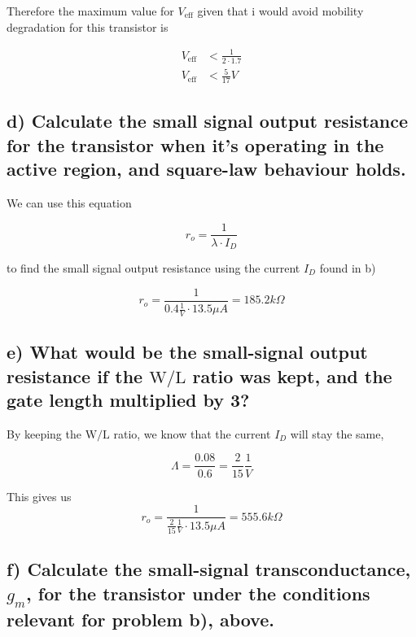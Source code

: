 Therefore the maximum value for $V_{\text{eff}}$ given that i would avoid mobility degradation for this transistor is 

\begin{align*}
    V_{\text{eff}}&<\frac{1}{2\cdot1.7}\\
    V_{\text{eff}}&<\frac{5}{17}V
\end{align*}


\subsection*{d) Calculate the small signal output resistance for the transistor when it's operating in the active region, and square-law behaviour holds.}

We can use this equation

\begin{equation*}
    r_{o}=\frac{1}{\lambda \cdot I_{D}}
\end{equation*}

to find the small signal output resistance using the current $I_D$ found in b)

\begin{equation*}
    r_{o}=\frac{1}{0.4 \frac{1}{V} \cdot 13.5\mu A}=185.2k \Omega
\end{equation*}

\subsection*{e) What would be the small-signal output resistance if the \( \mathrm{W} / \mathrm{L} \) ratio was kept, and the gate length multiplied by 3?}

By keeping the \( \mathrm{W} / \mathrm{L} \) ratio, we know that the current $I_D$ will stay the same,

\begin{equation*}
    \Lambda=\frac{0.08}{0.6}=\frac{2}{15}\frac{1}{V}
\end{equation*}

This gives us
\begin{equation*}
    r_{o}=\frac{1}{\frac{2}{15} \frac{1}{V} \cdot 13.5\mu A}=555.6k \Omega
\end{equation*}

\subsection*{f) Calculate the small-signal transconductance, \( g_{m} \), for the transistor under the conditions relevant for problem b), above.}

